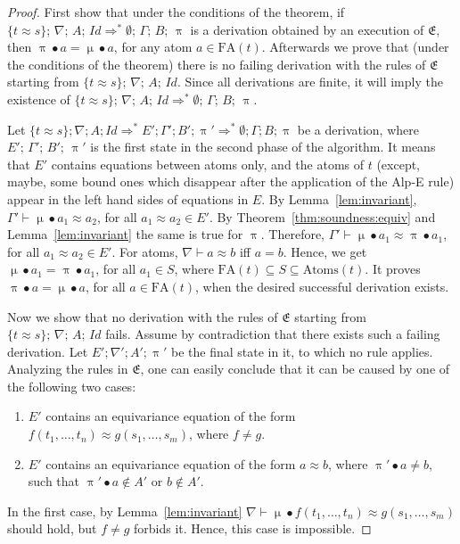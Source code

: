 \documentclass{llncs}
\newcommand{\Lra}{\Longrightarrow}
\newcommand{\idp}{\mathit{Id}}
\newcommand{\perm}{\approx}
\newcommand{\permef}{\bullet}
\newcommand\ppi{\uppi}
\newcommand\pmu{\upmu}
\newcommand{\msys}{\mathfrak{E}}
\newcommand{\Atoms}{A}
\newcommand{\atoms}{\mathrm{Atoms}}
\newcommand{\nablai}{{\nabla}}
\newcommand{\nablag}{\Gamma}
\newcommand{\fatom}{\mathrm{FA}}
\begin{document}
\begin{proof}
  First show that under the conditions of the theorem, if $ \{t\perm
  s\} ;\,\allowbreak \nablai ;\,\allowbreak \Atoms ;\,\allowbreak \idp
  \Lra^* \emptyset ;\, \nablag;\, B ;\, \ppi $ is a derivation
  obtained by an execution of $\msys$, then $\ppi\permef a =
  \pmu\permef a$, for any atom $a\in\fatom(t)$. Afterwards we prove
  that (under the conditions of the theorem) there is no failing
  derivation with the rules of $\msys$ starting from $\{t\perm s\}
  ;\,\allowbreak \nablai ;\,\allowbreak \Atoms ;\,\allowbreak
  \idp$. Since all derivations are finite, it will imply the existence
  of $ \{t\perm s\} ;\,\allowbreak \nablai ;\,\allowbreak \Atoms
  ;\,\allowbreak \idp \Lra^* \emptyset ;\, \nablag;\, B ;\, \ppi $.

  Let $\{t\perm s\} ;\allowbreak \nablai ;\allowbreak \Atoms
  ;\allowbreak \idp \Lra^* E'; \nablag'; B' ;\allowbreak \ppi' \Lra^*
  \emptyset ; \nablag; B ;\ppi $ be a derivation, where $E' ;\,
  \nablag';\, B' ;\, \ppi'$ is the first state in the second phase of
  the algorithm. It means that $E'$ contains equations between atoms
  only, and the atoms of $t$ (except, maybe, some bound ones which
  disappear after the application of the {\sf Alp-E} rule) appear in
  the left hand sides of equations in $E$. By
  Lemma~\ref{lem:invariant}, $\nablag' \vdash \pmu \permef a_1 \approx
  a_2 $, for all $a_1\perm a_2\in E'$. By
  Theorem~\ref{thm:soundness:equiv} and Lemma~\ref{lem:invariant} the
  same is true for $\ppi$. Therefore, $\nablag' \vdash \pmu \permef
  a_1 \approx \ppi \permef a_1 $, for all $a_1\perm a_2\in E'$. For
  atoms, $\nabla \vdash a\approx b$ iff $a=b$. Hence, we get
  $\pmu\permef a_1 = \ppi\permef a_1$, for all $a_1\in S$, where
  $\fatom(t)\subseteq S \subseteq \atoms(t)$. It proves $\ppi\permef a=
  \pmu\permef a$, for all $a\in\fatom(t)$, when the desired successful
  derivation exists.

  Now we show that no derivation with the rules of $\msys$ starting
  from $ \{t\perm s\} ;\,\allowbreak \nablai
  ;\,\allowbreak \Atoms ;\,\allowbreak \idp$ fails. Assume by
  contradiction that there exists such a failing derivation. Let
  $E';\nabla';A';\ppi'$ be the final state in it, to which no rule
  applies. Analyzing the rules in $\msys$, one can easily conclude
  that it can be caused by one of the following two cases:
\begin{enumerate}
  \item $E'$ contains an equivariance equation of the form
    $f(t_1,\ldots,t_n)\perm g(s_1,\ldots,\allowbreak s_m)$, where $f\neq g$.
  \item $E'$ contains an equivariance equation of the form $a\perm b$,
    where $\ppi'\permef a \neq b$, such that $\ppi'\permef
    a\notin A'$ or $b \notin A'$.
\end{enumerate} 
   In the first case, by Lemma~\ref{lem:invariant} $\nabla \vdash \pmu
   \permef f(t_1,\ldots,t_n) \approx g(s_1,\ldots,s_m)$ should hold,
   but $f\neq g$ forbids it. Hence, this case is impossible.


\end{proof}
\end{document}
